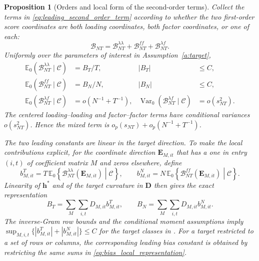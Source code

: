 \documentclass[11pt]{article}
\numberwithin{equation}{section}
\newtheorem{proposition}{Proposition}
\theoremstyle{remark}
\newcommand{\Ezero}{\mathbb E_0}
\newcommand{\bD}{\bm D}
\begin{document}
\begin{proposition}[Orders and local form of the second-order terms]
\label{prop:second_order_bias}
Collect the terms in \eqref{eq:leading_second_order_term} according to whether the two first-order score coordinates are both loading coordinates, both factor coordinates, or one of each:
$$
\mathcal B_{NT}
=
\mathcal B_{NT}^{\lambda\lambda}
+
\mathcal B_{NT}^{ff}
+
\mathcal B_{NT}^{\lambda f}.
$$
Uniformly over the parameters of interest in Assumption~\ref{a:target},
\begin{align*}
\Ezero(\mathcal B_{NT}^{\lambda\lambda}\mid\mathscr C)
&=B_T/T,
& |B_T|&\le C,\\
\Ezero(\mathcal B_{NT}^{ff}\mid\mathscr C)
&=B_N/N,
& |B_N|&\le C,\\
\Ezero(\mathcal B_{NT}^{\lambda f}\mid\mathscr C)
&=o(N^{-1}+T^{-1}),
&
\operatorname{Var}_0(\mathcal B_{NT}^{\lambda f}\mid\mathscr C)
&=o(s_{NT}^2).
\end{align*}
The centered loading--loading and factor--factor terms have conditional variances $o(s_{NT}^2)$. Hence the mixed term is $o_p(s_{NT})+o_p(N^{-1}+T^{-1})$.

The two leading constants are linear in the target direction. To make the local contributions explicit, for the coordinate direction $\bm E_{M,it}$ that has a one in entry $(i,t)$ of coefficient matrix $M$ and zeros elsewhere, define
$$
b_{M,it}^{T}
=
T\,\Ezero\!\left\{
\mathcal B_{NT}^{\lambda\lambda}(\bm E_{M,it})
\middle|\mathscr C
\right\},
\qquad
b_{M,it}^{N}
=
N\,\Ezero\!\left\{
\mathcal B_{NT}^{ff}(\bm E_{M,it})
\middle|\mathscr C
\right\}.
$$
Linearity of $\bm h^*$ and of the target curvature in $\bD$ then gives the exact representation
\begin{equation}
\label{eq:bias_local_representation}
B_T
=
\sum_M\sum_{i,t}D_{M,it}b_{M,it}^{T},
\qquad
B_N
=
\sum_M\sum_{i,t}D_{M,it}b_{M,it}^{N}.
\end{equation}
The inverse-Gram row bounds and the conditional moment assumptions imply $\sup_{M,i,t}\{|b_{M,it}^{T}|+|b_{M,it}^{N}|\}\le C$ for the target classes in . For a target restricted to a set of rows or columns, the corresponding leading bias constant is obtained by restricting the same sums in \eqref{eq:bias_local_representation}.
\end{proposition}
\end{document}

